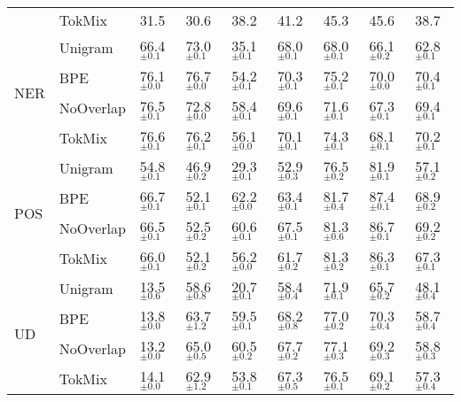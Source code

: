 \begin{table}
\begin{tabular}{lllllllll}
     & TokMix &              31.5 &              30.6 &              38.2 &              41.2 &              45.3 &              45.6 &              38.7 \\
\cline{1-9}
\multirow{4}{*}{NER} & Unigram &  66.4 $_{\pm0.1}$ &  73.0 $_{\pm0.1}$ &  35.1 $_{\pm0.1}$ &  68.0 $_{\pm0.1}$ &  68.0 $_{\pm0.1}$ &  66.1 $_{\pm0.2}$ &  62.8 $_{\pm0.1}$ \\
     & BPE &  76.1 $_{\pm0.0}$ &  76.7 $_{\pm0.0}$ &  54.2 $_{\pm0.1}$ &  70.3 $_{\pm0.1}$ &  75.2 $_{\pm0.1}$ &  70.0 $_{\pm0.0}$ &  70.4 $_{\pm0.1}$ \\
     & NoOverlap &  76.5 $_{\pm0.1}$ &  72.8 $_{\pm0.0}$ &  58.4 $_{\pm0.1}$ &  69.6 $_{\pm0.1}$ &  71.6 $_{\pm0.1}$ &  67.3 $_{\pm0.1}$ &  69.4 $_{\pm0.1}$ \\
     & TokMix &  76.6 $_{\pm0.1}$ &  76.2 $_{\pm0.1}$ &  56.1 $_{\pm0.0}$ &  70.1 $_{\pm0.1}$ &  74.3 $_{\pm0.1}$ &  68.1 $_{\pm0.1}$ &  70.2 $_{\pm0.1}$ \\
\cline{1-9}
\multirow{4}{*}{POS} & Unigram &  54.8 $_{\pm0.1}$ &  46.9 $_{\pm0.2}$ &  29.3 $_{\pm0.1}$ &  52.9 $_{\pm0.3}$ &  76.5 $_{\pm0.2}$ &  81.9 $_{\pm0.1}$ &  57.1 $_{\pm0.2}$ \\
     & BPE &  66.7 $_{\pm0.1}$ &  52.1 $_{\pm0.1}$ &  62.2 $_{\pm0.0}$ &  63.4 $_{\pm0.1}$ &  81.7 $_{\pm0.4}$ &  87.4 $_{\pm0.1}$ &  68.9 $_{\pm0.2}$ \\
     & NoOverlap &  66.5 $_{\pm0.1}$ &  52.5 $_{\pm0.2}$ &  60.6 $_{\pm0.1}$ &  67.5 $_{\pm0.1}$ &  81.3 $_{\pm0.6}$ &  86.7 $_{\pm0.1}$ &  69.2 $_{\pm0.2}$ \\
     & TokMix &  66.0 $_{\pm0.1}$ &  52.1 $_{\pm0.2}$ &  56.2 $_{\pm0.0}$ &  61.7 $_{\pm0.2}$ &  81.3 $_{\pm0.2}$ &  86.3 $_{\pm0.1}$ &  67.3 $_{\pm0.1}$ \\
\cline{1-9}
\multirow{4}{*}{UD} & Unigram &  13.5 $_{\pm0.6}$ &  58.6 $_{\pm0.8}$ &  20.7 $_{\pm0.1}$ &  58.4 $_{\pm0.4}$ &  71.9 $_{\pm0.1}$ &  65.7 $_{\pm0.2}$ &  48.1 $_{\pm0.4}$ \\
     & BPE &  13.8 $_{\pm0.0}$ &  63.7 $_{\pm1.2}$ &  59.5 $_{\pm0.1}$ &  68.2 $_{\pm0.8}$ &  77.0 $_{\pm0.2}$ &  70.3 $_{\pm0.4}$ &  58.7 $_{\pm0.4}$ \\
     & NoOverlap &  13.2 $_{\pm0.0}$ &  65.0 $_{\pm0.5}$ &  60.5 $_{\pm0.2}$ &  67.7 $_{\pm0.2}$ &  77.1 $_{\pm0.3}$ &  69.2 $_{\pm0.3}$ &  58.8 $_{\pm0.3}$ \\
     & TokMix &  14.1 $_{\pm0.0}$ &  62.9 $_{\pm1.2}$ &  53.8 $_{\pm0.1}$ &  67.3 $_{\pm0.5}$ &  76.5 $_{\pm0.1}$ &  69.1 $_{\pm0.2}$ &  57.3 $_{\pm0.4}$ \\

\end{tabular}
\end{table}
